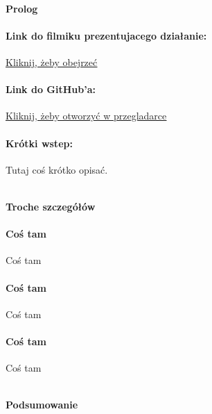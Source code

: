 \documentclass[a4paper,10pt,oneside]{book}
\begin{document}
\begin{sloppypar}
\clearpage
\vfill
\huge

	\begin{center}
	    \textbf{\\Prolog\\[1.3cm]}
	\end{center}
	\normalsize

	\paragraph{Link do filmiku prezentujacego działanie: }
		\underline{\href{http://google-styleguide.googlecode.com/svn/trunk/cppguide.html}{Kliknij, żeby obejrzeć}}
	\paragraph{Link do GitHub'a: }
		\underline{\href{http://google-styleguide.googlecode.com/svn/trunk/cppguide.html}{Kliknij, żeby otworzyć w przegladarce}}
	\paragraph{Krótki wstep: }
		Tutaj coś krótko opisać.
  
\clearpage
\vfill
\huge

	\begin{center}
	    \textbf{\\Troche szczegółów\\[1.3cm]}
	\end{center}
	\normalsize
	\paragraph{Coś tam}
	Coś tam
	
	\paragraph{Coś tam}
	Coś tam
	
	\paragraph{Coś tam}
	Coś tam
	\\[0.7cm]

\clearpage
\vfill
\huge

	\begin{center}
	    \textbf{\\Podsumowanie\\[1.3cm]}
	\end{center}
	\normalsize

\end{sloppypar}
\end{document}
